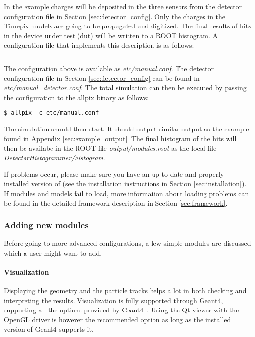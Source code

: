 In the example charges will be deposited in the three sensors from the detector configuration file in Section \ref{sec:detector_config}. Only the charges in the Timepix models are going to be propagated and digitized. The final results of hits in the device under test (dut) will be written to a ROOT histogram. A configuration file that implements this description is as follows:
\inputminted[frame=single,framesep=3pt,breaklines=true,tabsize=2,linenos]{ini}{../../etc/manual.conf}

The configuration above is available as \textit{etc/manual.conf}. The detector configuration file in Section \ref{sec:detector_config} can be found in \textit{etc/manual\_detector.conf}. The total simulation can then be executed by passing the configuration to the allpix binary as follows:

\begin{verbatim}
$ allpix -c etc/manual.conf
\end{verbatim}
The simulation should then start. It should output similar output as the example found in Appendix \ref{sec:example_output}. The final histogram of the hits will then be availabe in the ROOT file \textit{output/modules.root} as the local file \textit{DetectorHistogrammer/histogram}.

If problems occur, please make sure you have an up-to-date and properly installed version of \apsq (see the installation instructions in Section \ref{sec:installation}). If modules and models fail to load, more information about loading problems can be found in the detailed framework description in Section \ref{sec:framework}.

\subsubsection{Adding new modules}
Before going to more advanced configurations, a few simple modules are discussed which a user might want to add.

\paragraph{Visualization}
Displaying the geometry and the particle tracks helps a lot in both checking and interpreting the results. Visualization is fully supported through Geant4, supporting all the options provided by Geant4~\cite{geant4vis}. Using the Qt viewer with the OpenGL driver is however the recommended option as long as the installed version of Geant4 supports it.

